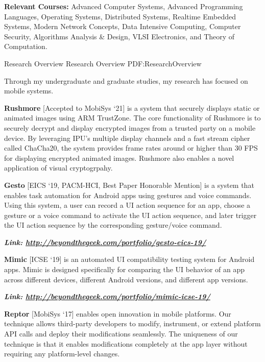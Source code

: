 \documentclass[letterpaper,MMMyyyy,nonstopmode]{simpleresumecv}
\begin{document}
\begin{Body}
\BigGap
\Entry
\textbf{Relevant Courses:} Advanced Computer Systems, Advanced Programming Languages, 
Operating Systems, Distributed Systems, Realtime Embedded Systems, Modern Network Concepts, 
Data Intensive Computing, Computer Security, Algorithms Analysis \& Design,
VLSI Electronics, and Theory of Computation.


\Section
{Research Overview}
{Research Overview}
{PDF:ResearchOverview}

\Entry
Through my undergraduate and graduate studies, my research has focused on mobile systems.

\Gap
\BulletItem
\textbf{Rushmore} [Accepted to MobiSys `21] is a system that securely displays static or animated images 
using ARM TrustZone. The core functionality of Rushmore is to securely decrypt and display encrypted 
images from a trusted party on a mobile device. By leveraging IPU's multiple display channels and
a fast stream cipher called ChaCha20, the system provides frame rates around or higher than 30 FPS 
for displaying encrypted animated images. Rushmore also enables a novel application of visual 
cryptogrpahy.
\hfill

\Gap
\BulletItem
\textbf{Gesto} [EICS `19, PACM-HCI, Best Paper Honorable Mention] is a system that enables task 
automation for Android apps using gestures 
and voice commands. Using this system, a user can record a UI action sequence for an app, 
choose a gesture or a voice command to activate the UI action sequence, and later trigger 
the UI action sequence by the corresponding gesture/voice command.

\hspace{2ex}
\textbf{\textit{Link: \href{http://beyondthegeek.com/portfolio/gesto-eics-19/}
{http://beyondthegeek.com/portfolio/gesto-eics-19/}}}
\hfill


\Gap
\BulletItem
\textbf{Mimic} [ICSE `19] is an automated UI compatibility testing system for Android apps. 
Mimic is designed specifically for comparing the UI behavior of an app across different 
devices, different Android versions, and different app versions.

\hspace{2ex}
\textbf{\textit{Link: \href{http://beyondthegeek.com/portfolio/mimic-icse-19/}{http://beyondthegeek.com/portfolio/mimic-icse-19/}}}
\hfill


\Gap
\BulletItem
\textbf{Reptor} [MobiSys `17] enables open innovation in mobile platforms. Our technique allows third-party 
developers to modify, instrument, or extend platform API calls and deploy their modifications 
seamlessly. The uniqueness of our technique is that it enables modifications completely at 
the app layer without requiring any platform-level changes. 


\end{Body}
\end{document}
